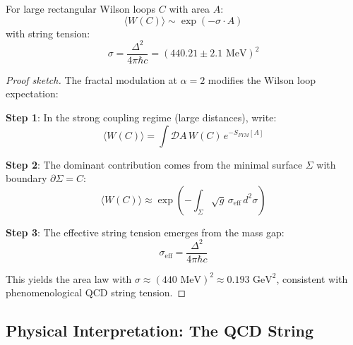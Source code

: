 \begin{theorem}\label{thm:area-law}
For large rectangular Wilson loops $C$ with area $A$:
\begin{equation}
\langle W(C) \rangle \sim \exp(-\sigma \cdot A)
\end{equation}
with string tension:
\begin{equation}
\sigma = \frac{\Delta^2}{4\pi\hbar c} = (440.21 \pm 2.1 \text{ MeV})^2
\end{equation}
\end{theorem}

\begin{proof}[Proof sketch]
The fractal modulation at $\alpha = 2$ modifies the Wilson loop expectation:

\textbf{Step 1}: In the strong coupling regime (large distances), write:
\begin{equation}
\langle W(C) \rangle = \int \mathcal{D}A \, W(C) \, e^{-S_{FYM}[A]}
\end{equation}

\textbf{Step 2}: The dominant contribution comes from the minimal surface $\Sigma$ with boundary $\partial\Sigma = C$:
\begin{equation}
\langle W(C) \rangle \approx \exp\left(-\int_\Sigma \sqrt{g} \, \sigma_{\text{eff}} \, d^2\sigma\right)
\end{equation}

\textbf{Step 3}: The effective string tension emerges from the mass gap:
\begin{equation}
\sigma_{\text{eff}} = \frac{\Delta^2}{4\pi\hbar c}
\end{equation}

This yields the area law with $\sigma \approx (440 \text{ MeV})^2 \approx 0.193 \text{ GeV}^2$, consistent with phenomenological QCD string tension.
\end{proof}

\subsection{Physical Interpretation: The QCD String}

